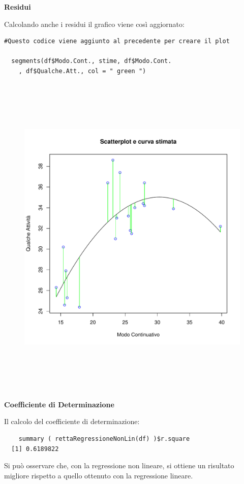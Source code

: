 \noindent \textbf{Residui}

Calcolando anche i residui il grafico viene così aggiornato:

\vspace{5mm}
\begin{lstlisting}
#Questo codice viene aggiunto al precedente per creare il plot

  segments(df$Modo.Cont., stime, df$Modo.Cont.
    , df$Qualche.Att., col = " green ")
\end{lstlisting}
\vspace{5mm}

\vspace{5mm}
\begin{figure}[!htbp]
    \centering
    \includegraphics[height=16cm]{ProgettoSAD/capitoli/images/s_desc_biv/scatter_nonlin_resid.pdf}
\end{figure}
\vspace{5mm}

\noindent \textbf{Coefficiente di Determinazione}

Il calcolo del coefficiente di determinazione:

\vspace{5mm}
\begin{lstlisting}
    summary ( rettaRegressioneNonLin(df) )$r.square
  [1] 0.6189822
\end{lstlisting}
\vspace{5mm}

Si può osservare che, con la regressione non lineare, si ottiene un risultato migliore rispetto a quello ottenuto con la regressione lineare.



\newpage
